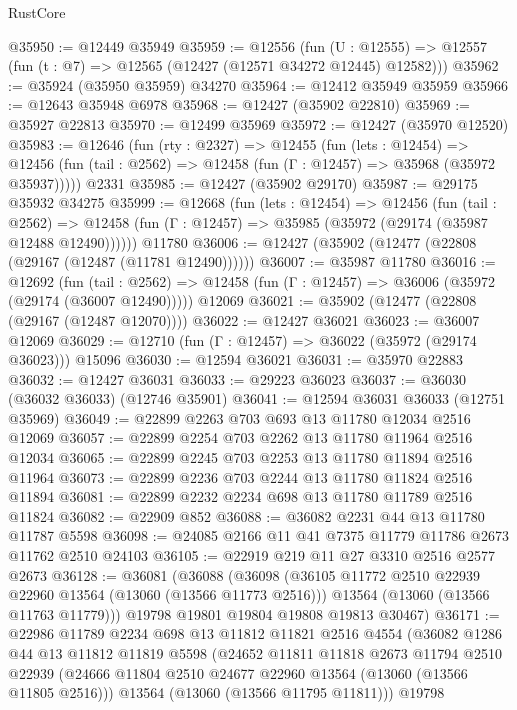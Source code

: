 \begin{lexlean}{RustCore}
\begin{coremodule}
@35950 := @12449 @35949
@35959 := @12556
    (fun (U : @12555) => @12557 (fun (t : @7) => @12565 (@12427 (@12571 @34272 @12445) @12582)))
@35962 := @35924 (@35950 @35959) @34270
@35964 := @12412 @35949 @35959
@35966 := @12643 @35948 @6978
@35968 := @12427 (@35902 @22810)
@35969 := @35927 @22813
@35970 := @12499 @35969
@35972 := @12427 (@35970 @12520)
@35983 := @12646
    (fun (rty : @2327) =>
    @12455
      (fun (lets : @12454) =>
      @12456 (fun (tail : @2562) => @12458 (fun (Γ : @12457) => @35968 (@35972 @35937)))))
    @2331
@35985 := @12427 (@35902 @29170)
@35987 := @29175 @35932 @34275
@35999 := @12668
    (fun (lets : @12454) =>
    @12456
      (fun (tail : @2562) =>
      @12458 (fun (Γ : @12457) => @35985 (@35972 (@29174 (@35987 @12488 @12490))))))
    @11780
@36006 := @12427 (@35902 (@12477 (@22808 (@29167 (@12487 (@11781 @12490))))))
@36007 := @35987 @11780
@36016 := @12692
    (fun (tail : @2562) => @12458 (fun (Γ : @12457) => @36006 (@35972 (@29174 (@36007 @12490)))))
    @12069
@36021 := @35902 (@12477 (@22808 (@29167 (@12487 @12070))))
@36022 := @12427 @36021
@36023 := @36007 @12069
@36029 := @12710 (fun (Γ : @12457) => @36022 (@35972 (@29174 @36023))) @15096
@36030 := @12594 @36021
@36031 := @35970 @22883
@36032 := @12427 @36031
@36033 := @29223 @36023
@36037 := @36030 (@36032 @36033) (@12746 @35901)
@36041 := @12594 @36031 @36033 (@12751 @35969)
@36049 := @22899 @2263 @703 @693 @13 @11780 @12034 @2516 @12069
@36057 := @22899 @2254 @703 @2262 @13 @11780 @11964 @2516 @12034
@36065 := @22899 @2245 @703 @2253 @13 @11780 @11894 @2516 @11964
@36073 := @22899 @2236 @703 @2244 @13 @11780 @11824 @2516 @11894
@36081 := @22899 @2232 @2234 @698 @13 @11780 @11789 @2516 @11824
@36082 := @22909 @852
@36088 := @36082 @2231 @44 @13 @11780 @11787 @5598
@36098 := @24085 @2166 @11 @41 @7375 @11779 @11786 @2673 @11762 @2510 @24103
@36105 := @22919 @219 @11 @27 @3310 @2516 @2577 @2673
@36128 := @36081
    (@36088
      (@36098
        (@36105 @11772 @2510 @22939 @22960 @13564 (@13060 (@13566 @11773 @2516)))
        @13564
        (@13060 (@13566 @11763 @11779)))
      @19798
      @19801
      @19804
      @19808
      @19813
      @30467)
@36171 := @22986
    @11789
    @2234
    @698
    @13
    @11812
    @11821
    @2516
    @4554
    (@36082
      @1286
      @44
      @13
      @11812
      @11819
      @5598
      (@24652
        @11811
        @11818
        @2673
        @11794
        @2510
        @22939
        (@24666 @11804 @2510 @24677 @22960 @13564 (@13060 (@13566 @11805 @2516)))
        @13564
        (@13060 (@13566 @11795 @11811)))
      @19798

\end{coremodule}
\end{lexlean}
